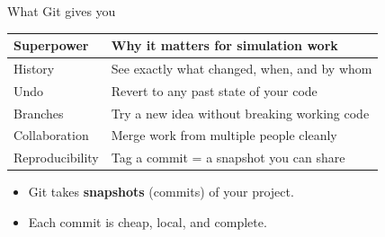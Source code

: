 \documentclass[aspectratio=169]{beamer}
\begin{document}
\begin{frame}{What Git gives you}
  \begin{table}
    \small
    \begin{tabular}{@{}ll@{}}
      \toprule
      Superpower & Why it matters for simulation work \\
      \midrule
      History & See exactly what changed, when, and by whom \\
      Undo & Revert to any past state of your code \\
      Branches & Try a new idea without breaking working code \\
      Collaboration & Merge work from multiple people cleanly \\
      Reproducibility & Tag a commit = a snapshot you can share \\
      \bottomrule
    \end{tabular}
  \end{table}
  \vspace{0.3cm}
  \begin{itemize}
    \item Git takes \textbf{snapshots} (commits) of your project.
    \item Each commit is cheap, local, and complete.
  \end{itemize}
\end{frame}
\end{document}

